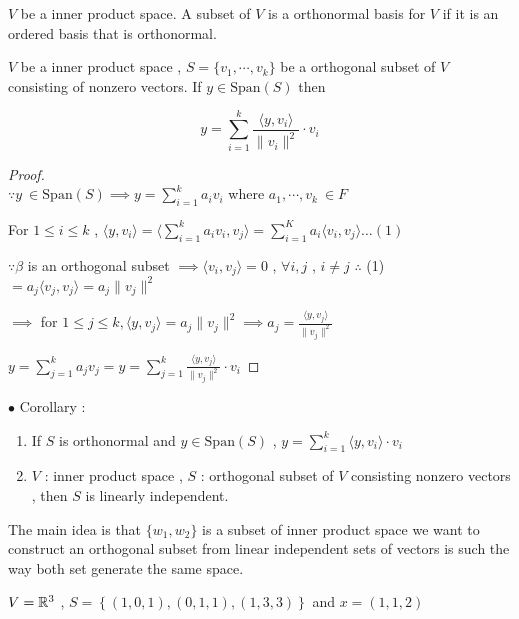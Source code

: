 	\begin{defn}
		$V$ be a inner product space. A subset of $V$ is a orthonormal basis for $V$ if it is an ordered basis that is orthonormal. 
	\end{defn}
	\begin{thm*}
		$V$ be a inner product space , $S = \{v_1 , \cdots , v_k\}$ be a orthogonal subset of $V$ consisting of nonzero vectors. If $y \in \mathrm{Span}(S)$ then 
		
		\[y = \sum_{i=1}^{k}\frac{\langle y,v_i\rangle}{\|v_i\|^2}\cdot v_i \]	
	\end{thm*}
	\begin{proof} $ $\\
		$\because y ~\in \mathrm{Span}(S)\implies y = \sum_{i = 1}^{k} a_iv_i $ where $a_1 , \cdots , v_k ~\in F$
		
		For $1\leq i \leq k$ , $\langle y , v_i \rangle = \langle \sum_{i=1}^k a_iv_i , v_j \rangle = \sum_{i=1}^{K}a_i\langle v_i , v_j \rangle\ldots(1)$
		
		$\because \beta $ is an orthogonal subset $\implies \langle v_i , v_j \rangle = 0$ , $\forall i , j$ , $i\neq j$ $\therefore$ (1) $ = a_j\langle v_j , v_j \rangle = a_j\|v_j\|^2 $
		
		$\implies $ for $1\leq j \leq k , \langle y , v_j \rangle = a_j \|v_j\|^2 \implies a_j = \frac{\langle y , v_j \rangle}{\|v_j\|^2}$
		
		$y = \sum_{j=1}^{k} a_jv_j = y = \sum_{j=1}^{k} \frac{\langle y , v_j \rangle}{\|v_j\|^2} \cdot v_i $
		
	\end{proof}
		
	$\bullet$ Corollary : 
		\begin{enumerate}
			\item If $S$ is orthonormal and $y \in \mathrm{Span}(S)$ , $ y= \sum_{i=1}^{k} \langle y , v_i \rangle \cdot v_i$
			\item $V$ : inner product space , $S$ : orthogonal subset of $V$ consisting nonzero vectors , then $S$ is linearly independent.
		\end{enumerate}
		
		The main idea is that $\{w_1 , w_2\}$ is a subset of inner product space we want to construct an orthogonal subset from linear independent sets of vectors is such the way both set generate the same space.
		
		
		
		\begin{example}
			$V = \mathbb{R}^3$ , $S = \left\{(1,0,1) , (0 , 1, 1) , (1,3,3)\right\}$ and $x = (1,1,2)$  
		\end{example}	
	
